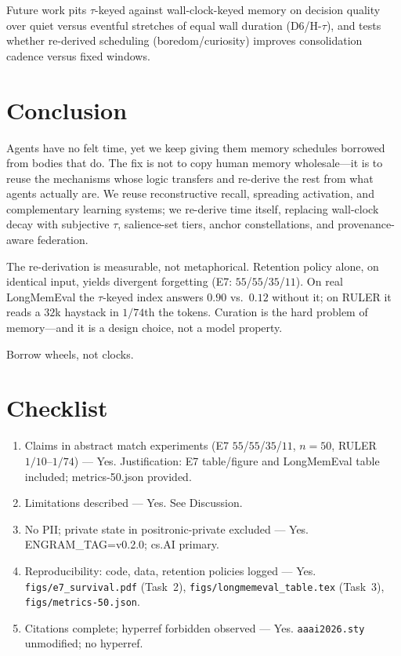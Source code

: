 \documentclass[letterpaper]{article}
\begin{document}
Future work pits $\tau$-keyed against wall-clock-keyed memory on decision quality over quiet versus eventful stretches of equal wall duration (D6/H-$\tau$), and tests whether re-derived scheduling (boredom/curiosity) improves consolidation cadence versus fixed windows.

\section{Conclusion}
Agents have no felt time, yet we keep giving them memory schedules borrowed from bodies that do. The fix is not to copy human memory wholesale---it is to reuse the mechanisms whose logic transfers and re-derive the rest from what agents actually are. We reuse reconstructive recall, spreading activation, and complementary learning systems; we re-derive time itself, replacing wall-clock decay with subjective $\tau$, salience-set tiers, anchor constellations, and provenance-aware federation.

The re-derivation is measurable, not metaphorical. Retention policy alone, on identical input, yields divergent forgetting (E7: $55$/$55$/$35$/$11$). On real LongMemEval the $\tau$-keyed index answers $0.90$ vs.\ $0.12$ without it; on RULER it reads a $32$k haystack in $1/74$th the tokens. Curation is the hard problem of memory---and it is a design choice, not a model property.

Borrow wheels, not clocks.



\section*{Checklist}\label{sec:repro}
\begin{enumerate}
\item Claims in abstract match experiments (E7 $55$/$55$/$35$/$11$, $n{=}50$, RULER $1/10$--$1/74$) --- Yes. Justification: E7 table/figure and LongMemEval table included; metrics-50.json provided.
\item Limitations described --- Yes. See Discussion.
\item No PII; private state in positronic-private excluded --- Yes. ENGRAM\_TAG=v0.2.0; cs.AI primary.
\item Reproducibility: code, data, retention policies logged --- Yes. \texttt{figs/e7\_survival.pdf} (Task~2), \texttt{figs/longmemeval\_table.tex} (Task~3), \texttt{figs/metrics-50.json}.
\item Citations complete; hyperref forbidden observed --- Yes. \texttt{aaai2026.sty} unmodified; no hyperref.
\end{enumerate}
\end{document}
